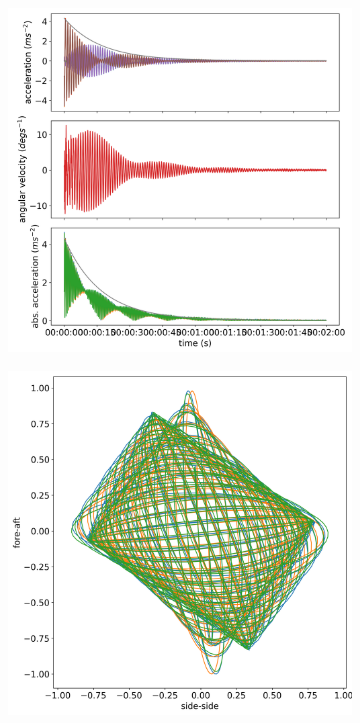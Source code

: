 \documentclass{article}
\begin{document}
\begin{figure}

    \centering
    \begin{subfigure}[b]{0.45\textwidth}
        \centering
        \includegraphics[width=\textwidth]{results/experiment/high_mass_acceleration.png}
        \caption{}
        \label{fig:high-mass:acc}
    \end{subfigure}
    \begin{subfigure}[b]{0.45\textwidth}
        \centering
        \includegraphics[width=\textwidth]{results/experiment/high_mass_orbit.png}

\end{subfigure}
\end{figure}
\end{document}
